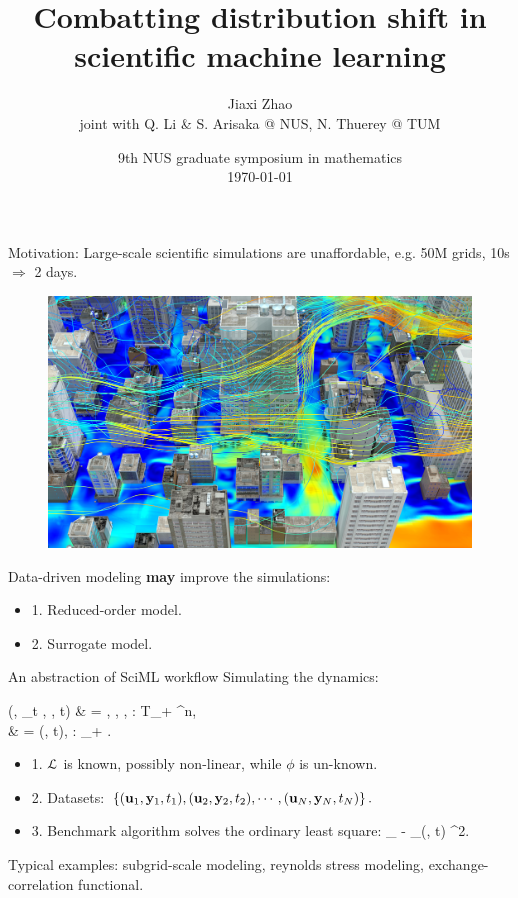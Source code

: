 \documentclass[aspectratio=169]{beamer}
\title[Distribution Mismatch]{Combatting distribution shift in scientific machine learning}
\author[J. Zhao]{Jiaxi Zhao \\ \small joint with Q. Li \& S. Arisaka @ NUS, N. Thuerey @ TUM}
\date[\today]{9th NUS graduate symposium in mathematics \\ \today}
\begin{document}
\par \setlength{\parindent}{2em}

\begin{frame}
\titlepage

\end{frame}

\begin{frame}{Motivation:}
	Large-scale scientific simulations are unaffordable, e.g. 50M grids, 10s $\Longrightarrow$ 2 days.
	\begin{figure}[ht]
		\centering
		\includegraphics[width=.5\linewidth]{fig/urban_environment.jpeg}
	\end{figure}

	Data-driven modeling \textbf{\color{red} may} improve the simulations:
	\begin{itemize}
		\item 1. Reduced-order model.
		\item 2. Surrogate model.
	\end{itemize}
\end{frame}

\begin{frame}{An abstraction of SciML workflow}
	Simulating the dynamics:
	\bequn
		\begin{aligned}
			\mcL(\mfu, \p_t \mfu, \mfy, t) & = , \quad \mfu \in \mcU, \mfy \in \mcY, \mcL: \mcU \times T\mcU \times \mcY \times \mbR_+ \rightarrow \mbR^{n},			\\
			\mfy & = \phi(\mfu, t), \quad \phi: \mcU \times \mbR_+ \rightarrow \mfy.
		\end{aligned}
	\eequn
	\begin{itemize}
		\item 1. $\mathcal{L}$ is known, possibly non-linear, {\color{red}while $\phi$ is un-known.}
		\item 2. Datasets: $\left\{ (\mathbf{u}_1, \mathbf{y}_1, t_1), (\mathbf{u}_2, \mathbf{y}_2, t_2), \cdots, (\mathbf{u}_N, \mathbf{y}_N, t_N )\right\}. $
		\item 3. {\color{red} Benchmark algorithm solves the ordinary least square:
		\bequn
			\arg\min_{\theta} \mbE \norml \mfy - \phi_{\theta}(\mfu, t) \normr^2.
		\eequn}
	\end{itemize}
	
	Typical examples: subgrid-scale modeling, reynolds stress modeling, exchange-correlation functional.

\end{frame}
\end{document}
